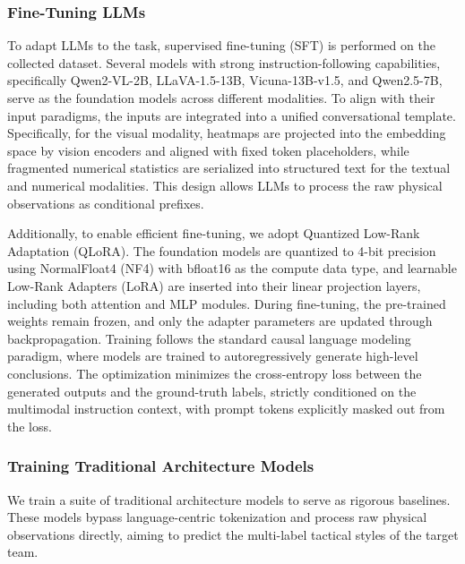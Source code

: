 \subsubsection{Fine-Tuning LLMs}
To adapt LLMs to the task, supervised fine-tuning (SFT) is performed on the collected dataset. Several models with strong instruction-following capabilities, specifically Qwen2-VL-2B, LLaVA-1.5-13B, Vicuna-13B-v1.5, and Qwen2.5-7B, serve as the foundation models across different modalities. To align with their input paradigms, the inputs are integrated into a unified conversational template. Specifically, for the visual modality, heatmaps are projected into the embedding space by vision encoders and aligned with fixed token placeholders, while fragmented numerical statistics are serialized into structured text for the textual and numerical modalities. This design allows LLMs to process the raw physical observations as conditional prefixes.

Additionally, to enable efficient fine-tuning, we adopt Quantized Low-Rank Adaptation (QLoRA). The foundation models are quantized to 4-bit precision using NormalFloat4 (NF4) with bfloat16 as the compute data type, and learnable Low-Rank Adapters (LoRA) are inserted into their linear projection layers, including both attention and MLP modules. During fine-tuning, the pre-trained weights remain frozen, and only the adapter parameters are updated through backpropagation. Training follows the standard causal language modeling paradigm, where models are trained to autoregressively generate high-level conclusions. The optimization minimizes the cross-entropy loss between the generated outputs and the ground-truth labels, strictly conditioned on the multimodal instruction context, with prompt tokens explicitly masked out from the loss.

\subsubsection{Training Traditional Architecture Models}
We train a suite of traditional architecture models to serve as rigorous baselines. These models bypass language-centric tokenization and process raw physical observations directly, aiming to predict the multi-label tactical styles of the target team.


